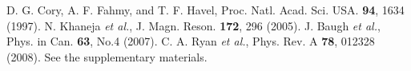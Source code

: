 \documentclass[twocolumn,showpacs,twoside,10pt,prl]{revtex4}
\begin{document}
\begin{thebibliography}{99}
 D. G. Cory, A. F. Fahmy, and T. F. Havel, Proc. Natl. Acad. Sci. USA. \textbf{94}, 1634 (1997).
 N. Khaneja \emph{et al.}, J. Magn. Reson. \textbf{172}, 296 (2005).
 J. Baugh \emph{et al.}, Phys. in Can. \textbf{63}, No.4
(2007).
 C. A. Ryan \emph{et al.}, Phys. Rev. A \textbf{78}, 012328 (2008).
 See the supplementary materials.
\end{thebibliography}
\end{document}

